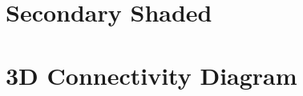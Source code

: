 \documentclass[bigger]{beamer}
\begin{document}
\section{Secondary Shaded}
  \begin{frame}
    \begin{center}
    \end{center}
  \end{frame}

\section{3D Connectivity Diagram}
\begin{frame}
    \begin{center}
       \\
    \end{center}
  \end{frame}

\end{document}
